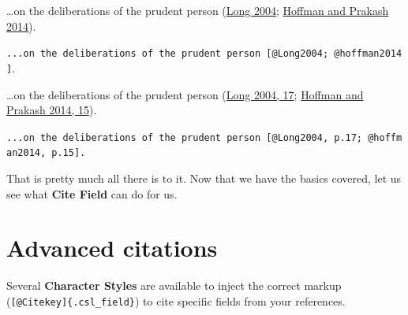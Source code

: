 \documentclass[
  12pt,
  a4paper,
  oneside,
  numbers=noenddot,
  titlepage,
  toclink=all,
  toc=bibliography]{scrbook}
\theoremstyle{definition}
\theoremstyle{definition}
\theoremstyle{definition}
\theoremstyle{plain}
\theoremstyle{plain}
\theoremstyle{plain}
\theoremstyle{plain}
\theoremstyle{plain}
\theoremstyle{remark}
\begin{document}
\begin{tcolorbox}[enhanced jigsaw, titlerule=0mm, left=2mm, toptitle=1mm, colback=white, coltitle=black, rightrule=.15mm, arc=.35mm, title=\textcolor{quarto-callout-note-color}{\faInfo}\hspace{0.5em}{(Author, Date; Author, Date)}, colframe=quarto-callout-note-color-frame, bottomrule=.15mm, colbacktitle=quarto-callout-note-color!10!white, toprule=.15mm, breakable, bottomtitle=1mm, opacityback=0, opacitybacktitle=0.6, leftrule=.75mm]

\ldots on the deliberations of the prudent person
\protect\hypertarget{cite_105}{}{\label{cite_105}(\protect\hyperlink{ref-Long2004}{Long
2004}; \protect\hyperlink{ref-hoffman2014}{Hoffman and Prakash 2014})}.

\texttt{...on\ the\ deliberations\ of\ the\ prudent\ person\ {[}@Long2004;\ @hoffman2014{]}}.

\ldots on the deliberations of the prudent person
\protect\hypertarget{cite_106}{}{\label{cite_106}(\protect\hyperlink{ref-Long2004}{Long
2004, 17}; \protect\hyperlink{ref-hoffman2014}{Hoffman and Prakash 2014,
15})}.

\texttt{...on\ the\ deliberations\ of\ the\ prudent\ person\ {[}@Long2004,\ p.17;\ @hoffman2014,\ p.15{]}.}

\end{tcolorbox}

That is pretty much all there is to it. Now that we have the basics
covered, let us see what \textbf{Cite Field} can do for us.

\hypertarget{sec-scriv44}{%
\section{Advanced citations}\label{sec-scriv44}}

\begin{tcolorbox}[enhanced jigsaw, titlerule=0mm, left=2mm, toptitle=1mm, colback=white, coltitle=black, rightrule=.15mm, arc=.35mm, title=\textcolor{quarto-callout-note-color}{\faInfo}\hspace{0.5em}{TLDR}, colframe=quarto-callout-note-color-frame, bottomrule=.15mm, colbacktitle=quarto-callout-note-color!10!white, toprule=.15mm, breakable, bottomtitle=1mm, opacityback=0, opacitybacktitle=0.6, leftrule=.75mm]

Several \textbf{Character Styles} are available to inject the correct
markup (\texttt{{[}@Citekey{]}\{.csl\_field\}}) to cite specific fields
from your references.

\end{tcolorbox}
\end{document}
